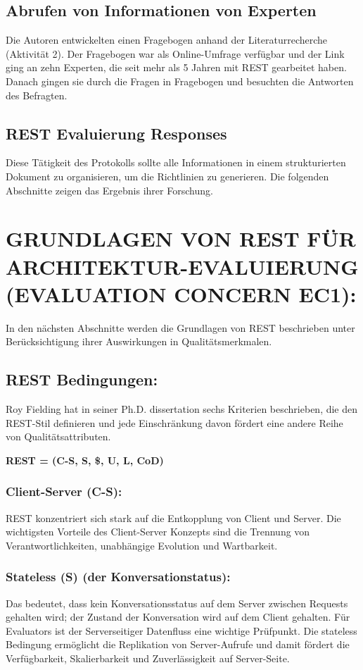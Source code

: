 \documentclass{acmsiggraph}
\begin{document}
\subsection{Abrufen von Informationen von Experten}
Die Autoren entwickelten einen Fragebogen anhand der Literaturrecherche (Aktivität 2). Der Fragebogen war als Online-Umfrage verfügbar und der Link ging an zehn Experten, die seit mehr als 5 Jahren mit REST gearbeitet haben.
Danach gingen sie durch die Fragen in Fragebogen und besuchten die Antworten des Befragten.
\subsection{REST Evaluierung Responses}
Diese Tätigkeit des Protokolls sollte alle Informationen in einem strukturierten Dokument zu organisieren, um die Richtlinien zu generieren.
Die folgenden Abschnitte zeigen das Ergebnis ihrer Forschung.
\section{GRUNDLAGEN VON REST FÜR ARCHITEKTUR-EVALUIERUNG (EVALUATION CONCERN EC1):}
In den nächsten Abschnitte werden die Grundlagen von REST beschrieben unter Berücksichtigung ihrer Auswirkungen in Qualitätsmerkmalen.

\subsection{REST Bedingungen:}
Roy Fielding hat in seiner Ph.D. dissertation \cite{royF} sechs Kriterien beschrieben, die den REST-Stil definieren und jede Einschränkung davon fördert eine andere Reihe von Qualitätsattributen.  \newline
\begin{center}
\textbf{REST = (C-S, S, \$, U, L, CoD)}
\end{center}
\subsubsection{Client-Server (C-S):}
REST konzentriert sich stark auf die Entkopplung von Client und Server.
Die wichtigsten Vorteile des Client-Server Konzepts sind die Trennung von Verantwortlichkeiten, unabhängige Evolution und Wartbarkeit.
\subsubsection{Stateless (S) (der Konversationstatus):}
Das bedeutet, dass kein Konversationsstatus auf dem Server zwischen Requests gehalten wird; der Zustand der Konversation wird auf dem Client gehalten.
Für Evaluators ist der Serverseitiger  Datenfluss  eine wichtige Prüfpunkt.
Die stateless Bedingung ermöglicht die Replikation von Server-Aufrufe und damit fördert die Verfügbarkeit, Skalierbarkeit und Zuverlässigkeit auf Server-Seite. 
\end{document}
